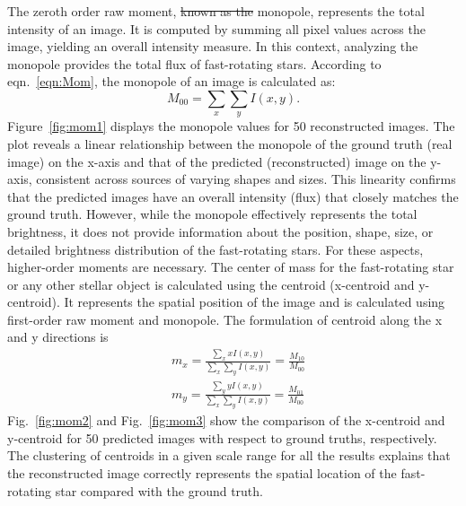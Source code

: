 \documentclass[fleqn,usenatbib,twocolumn]{mnras}
\makeatletter
\providecommand{\DIFadd}[1]{{\protect\color{blue}\uwave{#1}}} %
\providecommand{\DIFdel}[1]{{\protect\color{red}\sout{#1}}} %
\providecommand{\DIFaddbegin}{} %
\providecommand{\DIFaddend}{} %
\providecommand{\DIFdelbegin}{} %
\providecommand{\DIFdelend}{} %
\newcommand{\DIFscaledelfig}{0.5}
\newlength{\DIFdelgraphicswidth} %
\newlength{\DIFdelgraphicsheight} %
\newcommand{\DIFaddincludegraphics}[2][]{{\color{blue}\fbox{\DIFOincludegraphics[#1]{#2}}}} %
\newcommand{\DIFdelincludegraphics}[2][]{%
\sbox{\DIFdelgraphicsbox}{\DIFOincludegraphics[#1]{#2}}%
\settoboxwidth{\DIFdelgraphicswidth}{\DIFdelgraphicsbox} %
\settoboxtotalheight{\DIFdelgraphicsheight}{\DIFdelgraphicsbox} %
\scalebox{\DIFscaledelfig}{%
\parbox[b]{\DIFdelgraphicswidth}{\usebox{\DIFdelgraphicsbox}\\[-\baselineskip] \rule{\DIFdelgraphicswidth}{0em}}\llap{\resizebox{\DIFdelgraphicswidth}{\DIFdelgraphicsheight}{%
\setlength{\unitlength}{\DIFdelgraphicswidth}%
\begin{picture}(1,1)%
\thicklines\linethickness{2pt} %
{\color[rgb]{1,0,0}\put(0,0){\framebox(1,1){}}}%
{\color[rgb]{1,0,0}\put(0,0){\line( 1,1){1}}}%
{\color[rgb]{1,0,0}\put(0,1){\line(1,-1){1}}}%
\end{picture}%
}\hspace*{3pt}}} %
} %
\DeclareRobustCommand{\DIFaddbegin}{\DIFOaddbegin \let\includegraphics\DIFaddincludegraphics} %
\DeclareRobustCommand{\DIFaddend}{\DIFOaddend \let\includegraphics\DIFOincludegraphics} %
\DeclareRobustCommand{\DIFdelbegin}{\DIFOdelbegin \let\includegraphics\DIFdelincludegraphics} %
\DeclareRobustCommand{\DIFdelend}{\DIFOaddend \let\includegraphics\DIFOincludegraphics} %
\let\sout@orig\sout %
\renewcommand{\sout}[1]{\ifmmode\text{\sout@orig{\ensuremath{#1}}}\else\sout@orig{#1}\fi} %
\makeatother
\begin{document}
The zeroth order raw moment, \DIFdelbegin \DIFdel{known as the }\DIFdelend \DIFaddbegin \DIFadd{or }\DIFaddend monopole, represents the total intensity of an image. It is computed by summing all pixel values across the image, yielding an overall intensity measure. In this context, analyzing the monopole provides the total flux of fast-rotating stars. According to eqn.~\ref{eqn:Mom}, the monopole of an image is calculated as:
\begin{equation}
	M_{00} = \sum_{x} \sum_{y} I(x, y).
\end{equation}
Figure~\ref{fig:mom1} displays the monopole values for 50 reconstructed images. The plot reveals a linear relationship between the monopole of the ground truth (real image) on the x-axis and that of the predicted (reconstructed) image on the y-axis, consistent across sources of varying shapes and sizes. This linearity confirms that the predicted images have an overall intensity (flux) that closely matches the ground truth. However, while the monopole effectively represents the total brightness, it does not provide information about the position, shape, size, or detailed brightness distribution of the fast-rotating stars. For these aspects, higher-order moments are necessary.
The center of mass for the fast-rotating star or any other stellar object is calculated using the centroid (x-centroid and y-centroid). It represents the spatial position of the image and is calculated using first-order raw moment and monopole. The formulation of centroid along the x and y directions is
\begin{equation}
	\begin{aligned}
		&m_x = \frac{\sum_{x} x I(x,y)}{\sum_{x} \sum_{y} I(x, y)} = \frac{M_{10}}{M_{00}} \\
		&m_y = \frac{\sum_{y} y I(x,y)}{\sum_{x} \sum_{y} I(x, y)} = \frac{M_{01}}{M_{00}}
	\end{aligned}  
\end{equation}
Fig.~\ref{fig:mom2} and Fig.~\ref{fig:mom3} show the comparison of the x-centroid and y-centroid for 50 predicted images with respect to ground truths, respectively. The clustering of centroids in a given scale range for all the results explains that the reconstructed image correctly represents the spatial location of the fast-rotating star compared with the ground truth.

\end{document}

